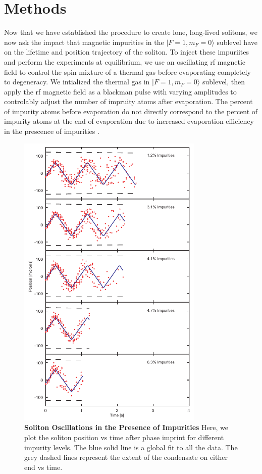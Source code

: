 \documentclass{nature}
\newcommand{\ket}[1]{|#1\rangle}
\begin{document}
\section{Methods}
Now that we have established the procedure to create lone, long-lived solitons, we now ask the impact that magnetic impurities in the $\ket{F=1,m_{F}=0}$ sublevel have on the lifetime and position trajectory of the soliton. To inject these impuriites and perform the experiments at equilibrium, we use an oscillating rf magnetic field to control the spin mixture of a thermal gas before evaporating completely to degeneracy. We intialized the thermal gas in $\ket{F=1,m_{F}=0}$ sublevel, then apply the rf magnetic field as a blackman pulse with varying amplitudes to controlably adjust the number of impruity atoms after evaporation. The percent of impurity atoms before evaporation do not directly correspond to the percent of impurity atoms at the end of evaporation due to increased evaporation efficiency in the prescence of impurities \cite{Fang2015}. 
\begin{figure}[h!]
   \includegraphics[width=89mm]{Figures/Fig2_solWImp.pdf}
   \caption{\textbf{Soliton Oscillations in the Presence of Impurities} Here, we plot the soliton position vs time after phase imprint for different impurity levels. The blue solid line is a global fit to all the data. The grey dashed lines represent the extent of the condensate on either end vs time.}
   \label{solWImp}
\end{figure}
\end{document}

